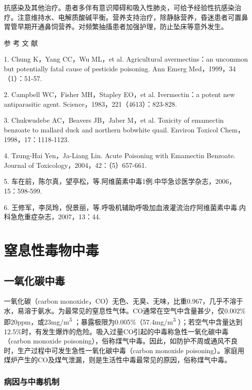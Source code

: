 抗感染及其他治疗。患者多伴有意识障碍和吸入性肺炎，可给予经验性抗感染治疗。注意维持水、电解质酸碱平衡。营养支持治疗，除静脉营养，昏迷患者可置鼻胃管早期开通鼻饲营养。对频繁抽搐患者加强护理，防止坠床等意外发生。

\hypertarget{text00146.htmlux5cux23CHP5-3-8-4}{}
参 考 文 献

1. Chung K，Yang CC，Wu ML，et al. Agricultural avermectins：an uncommon
but potentially fatal cause of pesticide poisoning. Ann Emerg
Med，1999，34（1）：51-57.

2. Campbell WC，Fisher MH，Stapley EO，et al. Ivermectin：a potent new
antiparasitic agent. Science，1983，221（4613）：823-828.

3. Chukwudebe AC，Beavers JB，Jaber M，et al. Toxicity of emamectin
benzoate to mallard duck and northern bobwhite quail. Environ Toxicol
Chem，1998，17：1118-1123.

4. Tzung-Hai Yen，Ja-Liang Lin. Acute Poisoning with Emamectin Benzoate.
Journal of Toxicology，2004，42：（5）657-661.

5.
车在前，陈尔真，望亭松，等.阿维菌素中毒1例.中华急诊医学杂志，2006，15：598-599.

6.
王修军，李凤玲，倪景丽，等.呼吸机辅助呼吸加血液灌流治疗阿维菌素中毒.内科急危重症杂志，2007，13：44.

\protect\hypertarget{text00147.html}{}{}

\chapter{窒息性毒物中毒}

\section{一氧化碳中毒}

一氧化碳（carbon
monoxide，CO）无色、无臭、无味，比重0.967，几乎不溶于水，易溶于氨水。为最常见的窒息性气体。CO通常在空气中含量甚少，仅0.002\%即20ppm，或23mg/m\textsuperscript{3}
；暴露极限为0.005\%（57.4mg/m\textsuperscript{3}
）；若空气中含量达到12.5\%时，有发生爆炸的危险。吸入过量CO引起的中毒称急性一氧化碳中毒（carbon
monoxide
poisoning），俗称煤气中毒。因此，如防护不周或通风不良时，生产过程中可发生急性一氧化碳中毒（carbon
monoxide
poisoning）。家庭用煤炉产生的CO及煤气泄漏，则是生活性中毒最常见的原因，俗称煤气中毒。

\subsection{病因与中毒机制}

